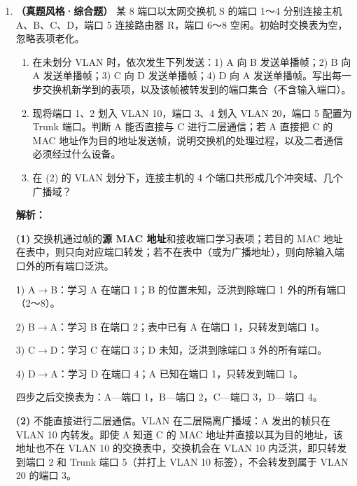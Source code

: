 \begin{enumerate}
\begin{center}
\end{center}\else \answerarea[10] \fi

\item \textbf{（真题风格·综合题）} 某 8 端口以太网交换机 S 的端口 1～4 分别连接主机 A、B、C、D，端口 5 连接路由器 R，端口 6～8 空闲。初始时交换表为空，忽略表项老化。

\begin{enumerate}
\item[(1)] 在未划分 VLAN 时，依次发生下列发送：1) A 向 B 发送单播帧；2) B 向 A 发送单播帧；3) C 向 D 发送单播帧；4) D 向 A 发送单播帧。写出每一步交换机新学到的表项，以及该帧被转发到的端口集合（不含输入端口）。
\item[(2)] 现将端口 1、2 划入 VLAN 10，端口 3、4 划入 VLAN 20，端口 5 配置为 Trunk 端口。判断 A 能否直接与 C 进行二层通信；若 A 直接把 C 的 MAC 地址作为目的地址发送帧，说明交换机的处理过程，以及二者通信必须经过什么设备。
\item[(3)] 在 (2) 的 VLAN 划分下，连接主机的 4 个端口共形成几个冲突域、几个广播域？
\end{enumerate}

\ifshowsolutions\par\noindent\textbf{解析：}

\textbf{(1)} 交换机通过帧的\textbf{源 MAC 地址}和接收端口学习表项；若目的 MAC 地址在表中，则只向对应端口转发；若不在表中（或为广播地址），则向除输入端口外的所有端口泛洪。

1) A$\to$B：学习 A 在端口 1；B 的位置未知，泛洪到除端口 1 外的所有端口（2～8）。

2) B$\to$A：学习 B 在端口 2；表中已有 A 在端口 1，只转发到端口 1。

3) C$\to$D：学习 C 在端口 3；D 未知，泛洪到除端口 3 外的所有端口。

4) D$\to$A：学习 D 在端口 4；A 已知在端口 1，只转发到端口 1。

四步之后交换表为：A—端口 1，B—端口 2，C—端口 3，D—端口 4。

\textbf{(2)} 不能直接进行二层通信。VLAN 在二层隔离广播域：A 发出的帧只在 VLAN 10 内转发。即使 A 知道 C 的 MAC 地址并直接以其为目的地址，该地址也不在 VLAN 10 的交换表中，交换机会在 VLAN 10 内泛洪，即只转发到端口 2 和 Trunk 端口 5（并打上 VLAN 10 标签），不会转发到属于 VLAN 20 的端口 3。


\end{enumerate}
